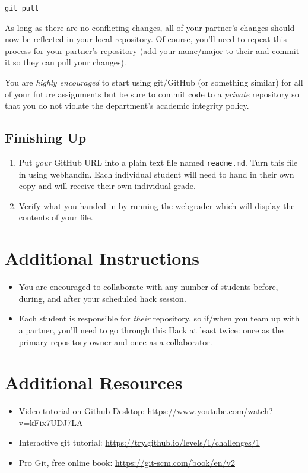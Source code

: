 \documentclass[12pt]{scrartcl}
\begin{document}
\texttt{git pull}

As long as there are no conflicting changes, all of your partner's
changes should now be reflected in your local repository.  Of course,
you'll need to repeat this process for your partner's repository (add
your name/major to their and commit it so they can pull your changes).  

You are \emph{highly encouraged} to start using git/GitHub (or 
something similar) for all of your future assignments 
but be sure to commit code to a \emph{private} repository 
so that you do not violate the department's academic integrity 
policy.  

\subsection{Finishing Up}

\begin{enumerate}
  \item Put \emph{your} GitHub URL into a plain text file named 
  \texttt{readme.md}.  Turn this file
  in using webhandin.  Each individual student will need
  to hand in their own copy and will receive their own individual
  grade.
  \item Verify what you handed in by running the webgrader which will
  display the contents of your file.
\end{enumerate}

\section*{Additional Instructions}

\begin{itemize}
  \item You are encouraged to collaborate with any number of students 
  before, during, and after your scheduled hack session.    
  \item Each student is responsible for \emph{their} repository, so 
  if/when you team up with a partner, you'll need to go through this
  Hack at least twice: once as the primary repository owner and once as
  a collaborator.
\end{itemize}
  
\section*{Additional Resources}
\label{section:additionalResources}

\begin{itemize} 
  \item Video tutorial on Github Desktop: \url{https://www.youtube.com/watch?v=kFix7UDJ7LA}
  \item Interactive git tutorial: \url{https://try.github.io/levels/1/challenges/1}
  \item Pro Git, free online book: \url{https://git-scm.com/book/en/v2}
\end{itemize}


  
\end{document}
